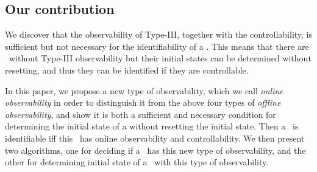 \subsection{Our contribution}
We discover that the observability of {\sf Type-III}, together with the controllability,  is  sufficient but not necessary for the identifiability of a {\BCN}. This means that there are \BCNs\  without {\sf Type-III} observability but their initial states can be determined without  resetting, and thus they can be identified if they are controllable.

In this paper, we propose a new type of observability, which we call {\em online observability} in order to distinguish it from the above four types  of {\em  offline observability}, and show it is both a sufficient and necessary condition for determining the initial state of a {\BCN} without resetting the initial state.
Then a \BCN\ is identifiable iff this \BCN\ has online observability and controllability. We then present two algorithms, one for deciding if a \BCN\ has this new type of observability, and the other for determining  initial state of a \BCN\ with this type of observability. 





